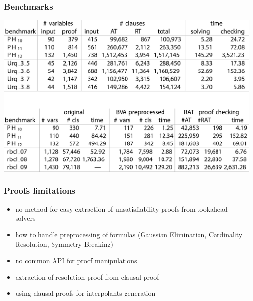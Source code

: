 \documentclass[xcolor=dvipsnames]{beamer}
\begin{document}
\begin{frame}
	\frametitle{Benchmarks}
    \begin{center}
        \includegraphics[width=\textwidth,height=0.8\textheight,keepaspectratio]{results.jpg}
    \end{center}
\end{frame}

\begin{frame}
	\frametitle{Proofs limitations}
	\begin{itemize}
		\item no method for easy extraction of unsatisfiability proofs from lookahead solvers
		\item how to handle preprocessing of formulas (Gaussian Elimination, Cardinality Resolution, Symmetry Breaking)
		\item no common API for proof manipulations
		\item extraction of resolution proof from clausal proof
		\item using clausal proofs for interpolants generation
	\end{itemize}
\end{frame}
\end{document}
